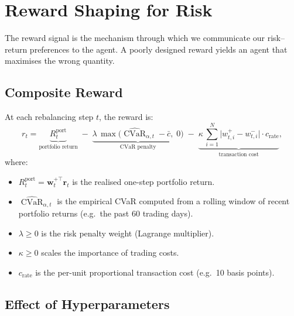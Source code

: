 \documentclass[11pt, a4paper]{article}
\theoremstyle{definition}
\theoremstyle{plain}
\theoremstyle{remark}
\newcommand{\CVaR}{\operatorname{CVaR}}
\begin{document}
\section{Reward Shaping for Risk}
\label{sec:reward}

The reward signal is the mechanism through which we communicate our
risk--return preferences to the agent. A poorly designed reward yields
an agent that maximises the wrong quantity.

\subsection{Composite Reward}

At each rebalancing step $t$, the reward is:
\begin{equation}
    r_t = \underbrace{R_t^{\text{port}}}_{\text{portfolio return}}
    \;-\; \underbrace{\lambda\,
    \max\!\bigl(\widehat{\CVaR}_{\alpha,t} - \bar{c},\; 0\bigr)
    }_{\text{CVaR penalty}}
    \;-\; \underbrace{\kappa\,
    \sum_{i=1}^{N}\bigl|w_{t,i}^{+} - w_{t,i}^{-}\bigr|
    \cdot c_{\text{rate}}
    }_{\text{transaction cost}},
    \label{eq:reward}
\end{equation}
where:
\begin{itemize}[leftmargin=2em]
    \item $R_t^{\text{port}} = \bm{w}_t^{+\top}\bm{r}_t$ is the
          realised one-step portfolio return.
    \item $\widehat{\CVaR}_{\alpha,t}$ is the empirical CVaR computed
          from a rolling window of recent portfolio returns (e.g.\ the
          past 60 trading days).
    \item $\lambda \geq 0$ is the risk penalty weight (Lagrange multiplier).
    \item $\kappa \geq 0$ scales the importance of trading costs.
    \item $c_{\text{rate}}$ is the per-unit proportional transaction cost
          (e.g.\ 10 basis points).
\end{itemize}

\subsection{Effect of Hyperparameters}
\end{document}
